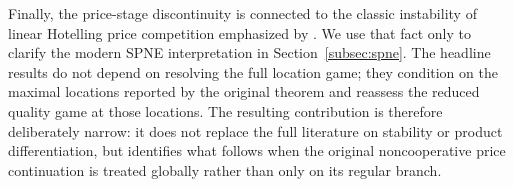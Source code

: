 Finally, the price-stage discontinuity is connected to the classic instability of linear Hotelling price competition emphasized by \citet{DAspremontGabszewiczThisse1979}. We use that fact only to clarify the modern SPNE interpretation in Section~\ref{subsec:spne}. The headline results do not depend on resolving the full location game; they condition on the maximal locations reported by the original theorem and reassess the reduced quality game at those locations. The resulting contribution is therefore deliberately narrow: it does not replace the full literature on stability or product differentiation, but identifies what follows when the original noncooperative price continuation is treated globally rather than only on its regular branch.
